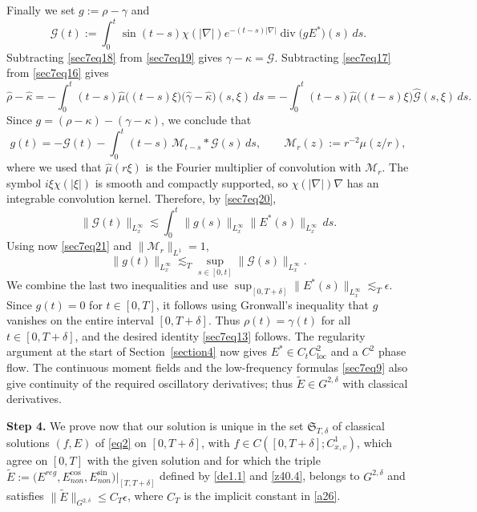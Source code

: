 \documentclass[reqno,11pt]{amsart}
\numberwithin{equation}{section}
\begin{document}
		Finally we set $g:=\rho-\gamma$ and
		\begin{equation}\label{sec7eq20}
			\mathcal G(t):=\int_0^t\sin(t-s)\chi(|\nabla|)e^{-(t-s)|\nabla|}
			\operatorname{div}\bigl(gE^\ast\bigr)(s)\,ds .
		\end{equation}
		Subtracting \eqref{sec7eq18} from \eqref{sec7eq19} gives
		$\gamma-\kappa=\mathcal G$. Subtracting \eqref{sec7eq17} from \eqref{sec7eq16} gives
		\[
			\widehat\rho-\widehat{\kappa}
			=-\int_0^t(t-s)\widehat\mu\bigl((t-s)\xi\bigr)
			\bigl(\widehat{\gamma}-\widehat{\kappa}\bigr)(s,\xi)\,ds
			=-\int_0^t(t-s)\widehat\mu\bigl((t-s)\xi\bigr)\widehat{\mathcal G}(s,\xi)\,ds .
		\]
		Since $g=(\rho-\kappa)-(\gamma-\kappa)$, we conclude that
		\begin{equation}\label{sec7eq21}
			g(t)=-\mathcal G(t)-\int_0^t(t-s)\,\mathcal M_{t-s}\ast\mathcal G(s)\,ds,
			\qquad
			\mathcal M_r(z):=r^{-2}\mu(z/r),
		\end{equation}
		where we used that $\widehat\mu(r\xi)$ is the Fourier multiplier of convolution with
		$\mathcal M_r$. The symbol $i\xi\chi(|\xi|)$ is smooth and compactly supported, so $\chi(|\nabla|)\nabla$ has an
		integrable convolution kernel. Therefore, by \eqref{sec7eq20},
		\[
			\|\mathcal G(t)\|_{L^\infty_x}
			\lesssim\int_0^t\|g(s)\|_{L^\infty_x}\|E^\ast(s)\|_{L^\infty_x}\,ds .
		\]
		Using now \eqref{sec7eq21} and $\|\mathcal M_r\|_{L^1}=1$,
		\[
			\|g(t)\|_{L^\infty_x}
			\lesssim_T \sup_{s\in[0,t]}\|\mathcal G(s)\|_{L^\infty_x}.
		\]
		We combine the last two inequalities and use
		$\sup_{[0,T+\delta]}\|E^\ast(s)\|_{L^\infty_x}\lesssim_T\epsilon$. Since $g(t)=0$ for $t\in [0,T]$, it follows using Gronwall's inequality that $g$ vanishes on the entire interval $[0,T+\delta]$. Thus $\rho(t)=\gamma(t)$ for all $t\in[0,T+\delta]$, and the desired identity \eqref{sec7eq13} follows.
	\begingroup
	The regularity argument at the start of Section~\ref{section4} now gives
	$E^\ast\in C_tC^2_{\mathrm{loc}}$ and a $C^2$ phase flow.
	The continuous moment fields and the low-frequency formulas \eqref{sec7eq9}
	also give continuity of the required oscillatory derivatives;
	thus $\widetilde E\in G^{2,\delta}$ with classical derivatives.
	\endgroup
	\medskip
	

	\textbf{Step 4.} We prove now that our solution is unique in the set $\mathfrak S_{T,\delta}$ of classical solutions $(f,E)$ of \eqref{eq2} on
	$[0,T+\delta]$, with $f\in C([0,T+\delta];C^1_{x,v})$, which agree on $[0,T]$ with the given
	solution and for which the triple $\widetilde E:=\bigl(E^{reg},E^{\cos}_{non},E^{\sin}_{non}\bigr)\big|_{[T,T+\delta]}$
	defined by \eqref{de1.1} and \eqref{z40.4}, belongs to $G^{2,\delta}$ and satisfies $\|\widetilde E\|_{G^{2,\delta}}\leq C_T\epsilon$, where $C_T$ is the implicit constant in \eqref{a26}.
\end{document}
